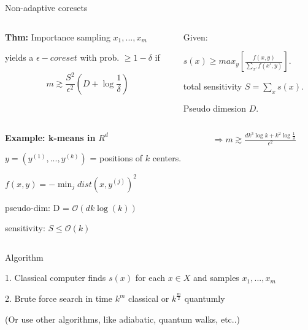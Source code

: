\documentclass[
  ignorenonframetext,
]{beamer}
\begin{document}
\begin{frame}{Non-adaptive coresets}
\protect\hypertarget{non-adaptive-coresets}{}
\vspace{0.2cm}
\begin{columns}[T]
\begin{column}{.55\textwidth}
\vspace{-0.5cm}
\begin{block}{}
\begin{small}
\textbf{Thm:} Importance sampling $x_1, ..., x_m$

yields a $\epsilon-coreset$ with prob. $\geq 1 - \delta$ if 

$$m \gtrsim \frac{S^2}{\epsilon^2} \left (D + \log \frac{1}{\delta} \right) $$

\end{small}
\end{block}
\end{column}
\begin{column}{.45\textwidth}
\begin{small}
Given:

$s(x) \geq max_{y} [\frac{f(x, y)}{\sum_{x'} f(x', y)}]$.

total sensitivity $S = \sum_x s(x)$.

Pseudo dimesion $D$.
\end{small}
\end{column}
\end{columns}

\vspace{0.5cm}
\begin{columns}[T]
\begin{column}{.6\textwidth}
\pause
\begin{small}
\textbf{Example: k-means in} $R^d$

$y = (y^{(1)}, ..., y^{(k)})$ = positions of $k$ centers.

$f(x,y) = -\min_j dist(x, y^{(j)})^2$

pseudo-dim: D = $\mathcal{O}(d k \log(k))$

sensitivity: $S \leq \mathcal{O}(k)$
\end{small}
\end{column}
\pause
\begin{column}{.4\textwidth}
\vspace{1cm}
$\Rightarrow m \gtrsim \frac{dk^3 \log k + k^2 \log {\frac{1}{\delta}}}{\epsilon^2}$
\end{column}
\end{columns}

\pause

\begin{block}{Algorithm}
\protect\hypertarget{algorithm}{}
\begin{small}
1. Classical computer finds $s(x)$ for each $x \in X$ and samples $x_1, ..., x_m$

2. Brute force search in time $k^m$ classical or $k^{\frac{m}{2}}$ quantumly

(Or use other algorithms, like adiabatic, quantum walks, etc..)
\end{small}
\end{block}
\end{frame}
\end{document}
